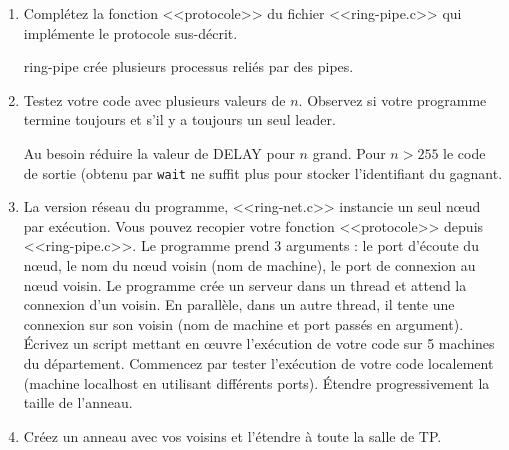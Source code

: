 \documentclass[11pt]{article}
\begin{document}
\begin{enumerate}
 \item Complétez la fonction <<protocole>> du fichier <<ring-pipe.c>> qui
implémente le protocole sus-décrit. 
 \begin{solution}
 ring-pipe crée plusieurs processus reliés par des pipes.
 \end{solution}
 \item Testez votre code avec plusieurs valeurs de $n$. Observez si votre
programme termine toujours et s'il y a toujours un seul leader.
 \begin{solution}
 Au besoin réduire la valeur de DELAY pour $n$ grand.
 Pour $n>255$ le code de sortie (obtenu par \texttt{wait} ne suffit plus pour 
 stocker l'identifiant du gagnant.
 \end{solution}
 \item La version réseau du programme, <<ring-net.c>> instancie un seul
n\oe{}ud par exécution. Vous pouvez recopier votre fonction <<protocole>>
depuis <<ring-pipe.c>>. Le programme prend 3 arguments : le port d'écoute du
n\oe{}ud, le nom du nœud voisin (nom de machine), le port de connexion au nœud
voisin. Le programme crée un serveur dans un thread et attend la connexion d'un
voisin. En parallèle, dans un autre thread, il tente une connexion sur son
voisin (nom de machine et port passés en argument). Écrivez un script mettant
en œuvre l'exécution de votre code sur 5 machines du département. Commencez par
tester l'exécution de votre code localement (machine localhost en utilisant
différents ports). Étendre progressivement la taille de l'anneau.
 \item Créez un anneau avec vos voisins et l'étendre à toute la salle de TP.
\end{enumerate}
\end{document}
